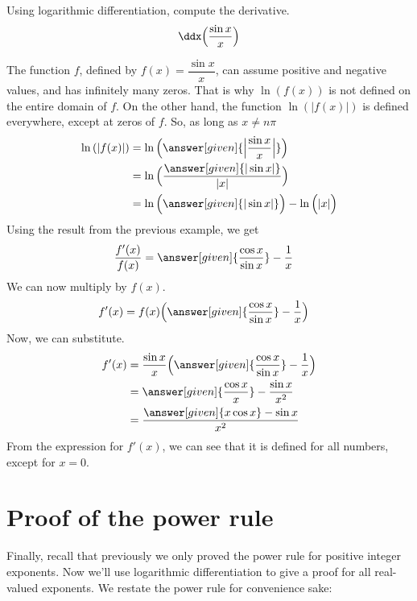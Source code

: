 \documentclass{ximera}
\begin{document}
\begin{example}
\author{Nela Lakos}
Using logarithmic differentiation, compute the derivative. 
\[
\ddx\Bigl(\dfrac{\sin{x}}{x}\Bigr)
\]
\begin{explanation}
The function $f$, defined by  $f(x)=\dfrac{\sin{x}}{x}$, can assume positive and negative values, and has infinitely many zeros.
That is why $\ln{(f(x))}$ is not  defined on  the entire domain of $f$. On the other hand, the function $\ln{(|f(x)|)}$ is defined everywhere, except at zeros of $f$.
So, as long as $x\ne n\pi$
\begin{align*}
\ln{(|f(x)|)} &=\ln{\Bigl(\answer[given]{\Big|\dfrac{\sin{x}}{x}\Big|}\Bigr)}\\
&=\ln{\Bigl(\dfrac{\answer[given]{|\sin{x}|}}{|x|}\Bigr)}\\
&=\ln{\Bigl(\answer[given]{|\sin{x}|}\Bigr)}-\ln{\Bigl(|x|\Bigr)}
\end{align*}
Using the result from the previous example, we get
\begin{align*}
\dfrac{f'(x)}{f(x)} &=\answer[given]{\dfrac{\cos{x}}{\sin{x}}}-\dfrac{1}{x}
\end{align*}
We can now multiply by $f(x)$.
\begin{align*}
f'(x) &=f(x)\Bigl(\answer[given]{\dfrac{\cos{x}}{\sin{x}}}-\dfrac{1}{x}\Bigr)
\end{align*}
Now, we can substitute.
\begin{align*}
f'(x) &=\dfrac{\sin{x}}{x}\Bigl(\answer[given]{\dfrac{\cos{x}}{\sin{x}}}-\dfrac{1}{x}\Bigr)\\
&=\answer[given]{\dfrac{\cos{x}}{x}}-\dfrac{\sin{x}}{x^2}\\
&=\dfrac{\answer[given]{x\cos{x}}-\sin{x}}{x^2}
\end{align*}
From the expression for $f'(x)$, we can see that it is defined for all numbers, except for $x=0$. 
\end{explanation}
\end{example}
\section{Proof of the power rule}


Finally, recall that previously we only proved the power rule for
positive integer exponents. Now we'll use logarithmic differentiation to give
a proof for all real-valued exponents. We restate the power rule
for convenience sake:
\end{document}
